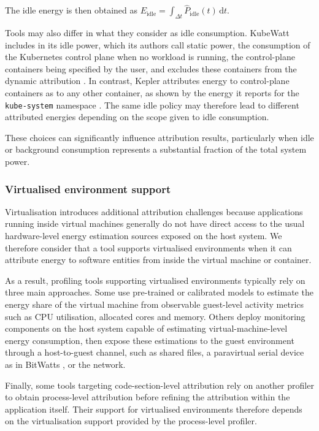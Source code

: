 \documentclass[
  acmsmall,
  screen,
  review,
  xcolor={dvipsnames,usenames}
]{acmart}
\begin{document}
The idle energy is then obtained as $E_{\mathrm{idle}} = \int_{\Delta t} \hat{P}_{\mathrm{idle}}(t)\,\mathrm{d}t$.

Tools may also differ in what they consider as idle consumption. KubeWatt includes in its idle power, which its authors call static power, the consumption of the Kubernetes control plane when no workload is running, the control-plane containers being specified by the user, and excludes these containers from the dynamic attribution \cite{pijnackerContainerlevelEnergyObservability2025}. In contrast, Kepler attributes energy to control-plane containers as to any other container, as shown by the energy it reports for the \texttt{kube-system} namespace \cite{pijnackerContainerlevelEnergyObservability2025}. The same idle policy may therefore lead to different attributed energies depending on the scope given to idle consumption.

These choices can significantly influence attribution results, particularly when idle or background consumption represents a substantial fraction of the total system power.

\subsubsection{\textbf{Virtualised environment support}} \label{sec:virtualised-support}

Virtualisation introduces additional attribution challenges because applications running inside virtual machines generally do not have direct access to the usual hardware-level energy estimation sources exposed on the host system. We therefore consider that a tool supports virtualised environments when it can attribute energy to software entities from inside the virtual machine or container.

As a result, profiling tools supporting virtualised environments typically rely on three main approaches. Some use pre-trained or calibrated models to estimate the energy share of the virtual machine from observable guest-level activity metrics such as CPU utilisation, allocated cores and memory. Others deploy monitoring components on the host system capable of estimating virtual-machine-level energy consumption, then expose these estimations to the guest environment through a host-to-guest channel, such as shared files, a paravirtual serial device as in BitWatts \cite{colmantProcesslevelPowerEstimation2015}, or the network.

Finally, some tools targeting code-section-level attribution rely on another profiler to obtain process-level attribution before refining the attribution within the application itself. Their support for virtualised environments therefore depends on the virtualisation support provided by the process-level profiler.
\end{document}

